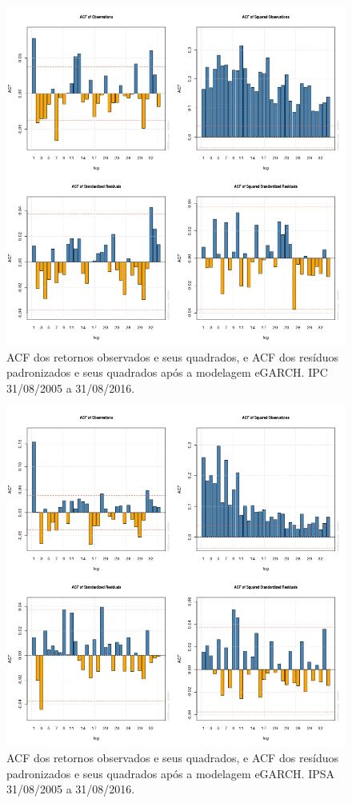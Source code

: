 \documentclass[review]{elsarticle}
\theoremstyle{definition}
\begin{document}
\begin{figure}[H]
	\centering
	\includegraphics[width=0.9\linewidth]{artigo-acf-IPC}
	\caption{ACF dos retornos observados e seus quadrados, e ACF dos resíduos padronizados e seus quadrados após a modelagem eGARCH. IPC 31/08/2005 a 31/08/2016.}
	\label{fig:artigo-acf-ipc}
\end{figure}

\begin{figure}[H]
	\centering
	\includegraphics[width=0.9\linewidth]{artigo-acf-IPSA}
	\caption{ACF dos retornos observados e seus quadrados, e ACF dos resíduos padronizados e seus quadrados após a modelagem eGARCH. IPSA 31/08/2005 a 31/08/2016.}
	\label{fig:artigo-acf-ipsa}
\end{figure}
\end{document}
